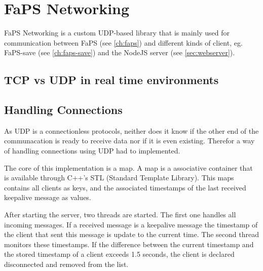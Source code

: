 \chapter{FaPS Networking}
\label{ch:faps-networking}

\author{Nico Kratky}
%

FaPS Networking is a custom UDP-based library that is mainly used for communication between FaPS (see \ref{ch:faps}) and different kinds of client, eg. FaPS-save (see \ref{ch:faps-save}) and the NodeJS server (see
\ref{sec:webserver}).

\section{TCP vs UDP in real time environments}

%

\cite{TCPUDPRTlifesize}


\section {Handling Connections}

As UDP is a connectionless protocols, neither does it know if the other end of the communacation is ready to receive data nor if it is even existing. Therefor a way of handling connections using UDP had to implemented.

The core of this implementation is a map. A map is a associative container that is available through C++'s STL (Standard Template Library). This maps contains all clients as keys, and the associated timestamps of the last
received keepalive message as values.

After starting the server, two threads are started. The first one handles all incoming messages. If a received message is a keepalive message the timestamp of the client that sent this message is update
to the current time. The second thread monitors these timestamps. If the difference between the current timestamp and the stored timestamp of a client exceeds 1.5 seconds, the client is declared disconnected and removed
from the list.


